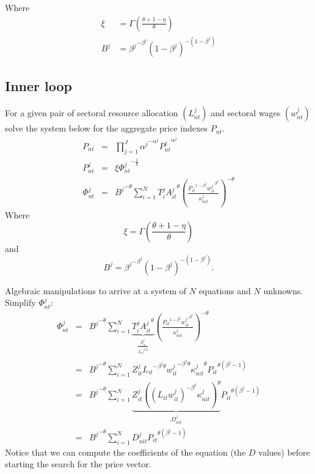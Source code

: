 \documentclass[11pt,oneside,a4paper]{article}
\begin{document}
Where
\begin{align}
  \nonumber
  \xi &= \Gamma\left(\frac{\theta + 1 - \eta}{\theta}\right) \\
  \nonumber
  B^j &= {\beta^j}^{- \beta^j} (1 - \beta^j)^{-(1 - \beta^j)}
\end{align}

\newpage
\subsection{Inner loop}
For a given pair of sectoral resource allocation $(L_{nt}^j)$ and sectoral wages $(w_{nt}^j)$ solve the system below for the aggregate price indexes $P_{nt}.$
\begin{eqnarray}
  P_{nt} &=& \prod_{j = 1}^J {\alpha^j}^{- \alpha^j} {P_{nt}^j}^{\alpha^j} \label{aggr1}\\
  P_{nt}^j &=& \xi {\Phi_{nt}^j}^{-\frac{1}{\theta}} \label{aggr2} \\
  \Phi_{nt}^j &=& {B^j}^{-\theta} \sum_{i = 1}^N T_i^j {A_{it}^j}^{\theta} \left(\frac{{P_{it}}^{1 - \beta^j} {w_{it}^j}^{\beta^j}}{\kappa_{nit}^j}\right)^{-\theta}
\end{eqnarray}
Where $$\xi = \Gamma\left(\frac{\theta + 1 - \eta}{\theta}\right)$$ and $$B^j = {\beta^j}^{- \beta^j} (1 - \beta^j)^{-(1 - \beta^j)}.$$

Algebraic manipulations to arrive at a system of $N$ equations and $N$ unknowns.
%
Simplify $\Phi_{nt}^j:$
\begin{eqnarray*}
  \Phi_{nt}^j &=&  {B^j}^{-\theta} \sum_{i = 1}^N \underbrace{T_i^j {A_{it}^j}^{\theta}}_{\frac{Z_{it}^j}{{L_{it}}^{\beta^j\theta}}} \left(\frac{{P_{it}}^{1 - \beta^j} {w_{it}^j}^{\beta^j}}{\kappa_{nit}^j}\right)^{-\theta}\\
  &=& {B^j}^{-\theta} \sum_{i = 1}^N Z_{it}^j {L_{it}}^{- \beta^j\theta} {w_{it}^j}^{-\beta^j\theta} {\kappa_{nit}^j}^{\theta}{P_{it}}^{\theta(\beta^j - 1)}\\
  &=& {B^j}^{-\theta} \sum_{i = 1}^N \underbrace{Z_{it}^j {\left((L_{it}w_{it}^j)^{- \beta^j} \kappa_{nit}^j\right)}^{\theta}}_{D_{nit}^j} {P_{it}}^{\theta(\beta^j - 1)}\\
  &=& {B^j}^{-\theta} \sum_{i = 1}^N D_{nit}^j{P_{it}}^{\theta(\beta^j - 1)}
\end{eqnarray*}
%
Notice that we can compute the coefficients of the equation (the $D$ values) before starting the search for the price vector.
\end{document}
